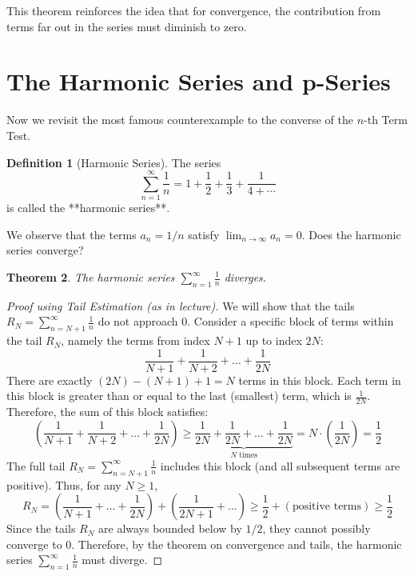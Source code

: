 \documentclass[11pt, letterpaper]{article}
\theoremstyle{plain} %
\newtheorem{theorem}{Theorem}[section] %
\theoremstyle{definition} %
\newtheorem{definition}[theorem]{Definition} %
\theoremstyle{remark} %
\begin{document}
This theorem reinforces the idea that for convergence, the contribution from terms far out in the series must diminish to zero.

\section{The Harmonic Series and p-Series}

Now we revisit the most famous counterexample to the converse of the $n$-th Term Test.

\begin{definition}[Harmonic Series]
The series
\[ \sum_{n=1}^{\infty} \frac{1}{n} = 1 + \frac{1}{2} + \frac{1}{3} + \frac{1}{4 + \dotsb} \]
is called the **harmonic series**.
\end{definition}

We observe that the terms $a_n = 1/n$ satisfy $\lim_{n \to \infty} a_n = 0$. Does the harmonic series converge?

\begin{theorem}
The harmonic series $\sum_{n=1}^{\infty} \frac{1}{n}$ diverges.
\end{theorem}

\begin{proof}[Proof using Tail Estimation (as in lecture)]
We will show that the tails $R_N = \sum_{n=N+1}^\infty \frac{1}{n}$ do not approach 0.
Consider a specific block of terms within the tail $R_N$, namely the terms from index $N+1$ up to index $2N$:
\[ \frac{1}{N+1} + \frac{1}{N+2} + \dots + \frac{1}{2N} \]
There are exactly $(2N) - (N+1) + 1 = N$ terms in this block.
Each term in this block is greater than or equal to the last (smallest) term, which is $\frac{1}{2N}$.
Therefore, the sum of this block satisfies:
\[ \left( \frac{1}{N+1} + \frac{1}{N+2} + \dots + \frac{1}{2N} \right) \ge \underbrace{\frac{1}{2N} + \frac{1}{2N} + \dots + \frac{1}{2N}}_{N \text{ times}} = N \cdot \left( \frac{1}{2N} \right) = \frac{1}{2} \]
The full tail $R_N = \sum_{n=N+1}^\infty \frac{1}{n}$ includes this block (and all subsequent terms are positive). Thus, for any $N \ge 1$,
\[ R_N = \left( \frac{1}{N+1} + \dots + \frac{1}{2N} \right) + \left( \frac{1}{2N+1} + \dots \right) \ge \frac{1}{2} + (\text{positive terms}) \ge \frac{1}{2} \]
Since the tails $R_N$ are always bounded below by $1/2$, they cannot possibly converge to 0.
Therefore, by the theorem on convergence and tails, the harmonic series $\sum_{n=1}^{\infty} \frac{1}{n}$ must diverge.
\end{proof}
\end{document}
